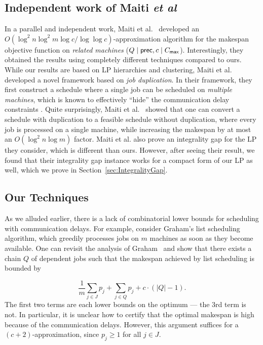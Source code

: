 \subsection{Independent work of Maiti {\em et al}}
In a parallel and independent work, Maiti {et al.}~\cite{MRSSV} developed an $O(\log^2 n \log^2 m \log c / \log \log c)$-approximation algorithm for the makespan objective function on {\em related machines} ($Q \mid \mathsf{prec}, c \mid C_{\mathsf{max}}$).
Interestingly, they obtained the results using completely different techniques compared to ours.
While our results are based on LP hierarchies and clustering, Maiti {et al.}~\cite{MRSSV} developed a novel framework based on {\em job duplication}.
In their framework, they first construct a schedule where a single job can be scheduled on {\em multiple machines}, which is known to effectively ``hide'' the communication delay constraints \cite{PapadimitriouY90}.
Quite surprisingly, Maiti {et al.}~\cite{MRSSV} showed that one can convert a schedule with duplication to a feasible schedule without duplication, where every job is processed on a single machine, while increasing the makespan by at most an $O(\log^2 n \log m)$ factor.
 Maiti {et al.} also prove an integrality gap for the LP they consider, which is different than ours. However, after seeing their result, we found that their integrality gap instance works for a compact form of our LP as well, which we prove in Section~\ref{sec:IntegralityGap}.


\subsection{Our Techniques}



As we alluded earlier, there is a lack of
combinatorial lower bounds for scheduling with communication delays. For example, consider {Graham's list scheduling algorithm}, which greedily processes jobs on $m$ machines as soon as they become available. One can revisit the analysis of Graham~\cite{GrahamListScheduling1966} and show that there exists a chain $Q$ of dependent jobs such that the makespan achieved by list scheduling is bounded by

\[
  \frac{1}{m} \sum_{j \in J} p_j + \sum_{j \in Q} p_j + c \cdot (|Q|-1). 
\]
The first two terms are each lower bounds on the optimum --- the 3rd term is not. In particular, it is unclear 
how to certify that the optimal makespan is high because of the communication delays. However, this argument suffices for a
$(c+2)$-approximation, since $p_j \geq 1$ for all $j \in J$.

